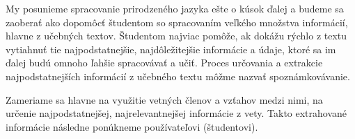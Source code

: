My posunieme spracovanie prirodzeného jazyka ešte o kúsok ďalej a budeme sa zaoberať ako dopomôcť študentom so spracovaním veľkého množstva informácií, hlavne z učebných textov. Študentom najviac pomôže, ak dokážu rýchlo z textu vytiahnuť tie najpodstatnejšie, najdôležitejšie informácie a údaje, ktoré sa im ďalej budú omnoho ľahšie spracovávať a učiť. Proces určovania a extrakcie najpodstatnejších informácií z učebného textu môžme nazvať spoznámkovávanie.

Zameriame sa hlavne na využitie vetných členov a vzťahov medzi nimi, na určenie najpodstatnejšej, najrelevantnejšej informácie z vety. Takto extrahované informácie následne ponúkneme používateľovi (študentovi).